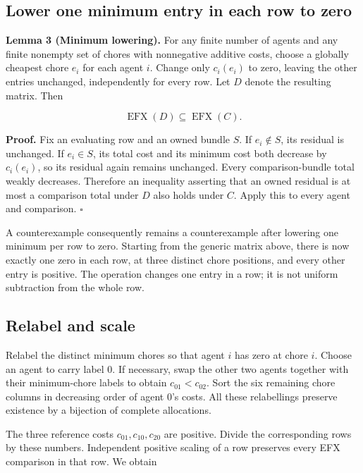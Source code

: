 \documentclass[
  11pt,
]{article}
\newcounter{none} %
\begin{document}
\subsection{Lower one minimum entry in each row to
zero}\label{lower-one-minimum-entry-in-each-row-to-zero}

\textbf{Lemma 3 (Minimum lowering).} For any finite number of agents and
any finite nonempty set of chores with nonnegative additive costs,
choose a globally cheapest chore \(e_i\) for each agent \(i\). Change
only \(c_i(e_i)\) to zero, leaving the other entries unchanged,
independently for every row. Let \(D\) denote the resulting matrix. Then

\[
\operatorname{EFX}(D)\subseteq\operatorname{EFX}(C).
\]

\textbf{Proof.} Fix an evaluating row and an owned bundle \(S\). If
\(e_i\notin S\), its residual is unchanged. If \(e_i\in S\), its total
cost and its minimum cost both decrease by \(c_i(e_i)\), so its residual
again remains unchanged. Every comparison-bundle total weakly decreases.
Therefore an inequality asserting that an owned residual is at most a
comparison total under \(D\) also holds under \(C\). Apply this to every
agent and comparison. \(\square\)

A counterexample consequently remains a counterexample after lowering
one minimum per row to zero. Starting from the generic matrix above,
there is now exactly one zero in each row, at three distinct chore
positions, and every other entry is positive. The operation changes one
entry in a row; it is not uniform subtraction from the whole row.

\subsection{Relabel and scale}\label{relabel-and-scale}

Relabel the distinct minimum chores so that agent \(i\) has zero at
chore \(i\). Choose an agent to carry label 0. If necessary, swap the
other two agents together with their minimum-chore labels to obtain
\(c_{01}<c_{02}\). Sort the six remaining chore columns in decreasing
order of agent 0's costs. All these relabellings preserve existence by a
bijection of complete allocations.

The three reference costs \(c_{01},c_{10},c_{20}\) are positive. Divide
the corresponding rows by these numbers. Independent positive scaling of
a row preserves every EFX comparison in that row. We obtain
\end{document}
